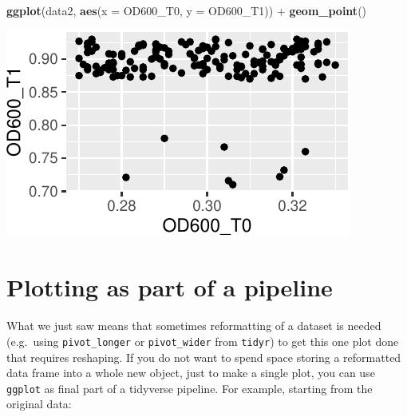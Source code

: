 \documentclass[]{book}
\newenvironment{Shaded}{}{}
\newcommand{\DataTypeTok}[1]{\textcolor[rgb]{0.56,0.13,0.00}{#1}}
\newcommand{\KeywordTok}[1]{\textcolor[rgb]{0.00,0.44,0.13}{\textbf{#1}}}
\newcommand{\NormalTok}[1]{#1}
\newcommand{\OperatorTok}[1]{\textcolor[rgb]{0.40,0.40,0.40}{#1}}
\newcommand{\StringTok}[1]{\textcolor[rgb]{0.25,0.44,0.63}{#1}}
\begin{document}
\begin{Shaded}
\begin{Highlighting}[]
\KeywordTok{ggplot}\NormalTok{(data2, }\KeywordTok{aes}\NormalTok{(}\DataTypeTok{x =}\NormalTok{ OD600_T0, }\DataTypeTok{y  =}\NormalTok{ OD600_T1)) }\OperatorTok{+}
\StringTok{  }\KeywordTok{geom_point}\NormalTok{()}
\end{Highlighting}
\end{Shaded}

\begin{center}\includegraphics[width=\textwidth]{TRES-Tidy-Tutorial_files/figure-latex/unnamed-chunk-137-1} \end{center}

\hypertarget{plotting-as-part-of-a-pipeline}{%
\section{Plotting as part of a pipeline}\label{plotting-as-part-of-a-pipeline}}

What we just saw means that sometimes reformatting of a dataset is needed (e.g.~using \texttt{pivot\_longer} or \texttt{pivot\_wider} from \texttt{tidyr}) to get this one plot done that requires reshaping. If you do not want to spend space storing a reformatted data frame into a whole new object, just to make a single plot, you can use \texttt{ggplot} as final part of a tidyverse pipeline. For example, starting from the original data:

\begin{Shaded}
\end{Shaded}
\end{document}
